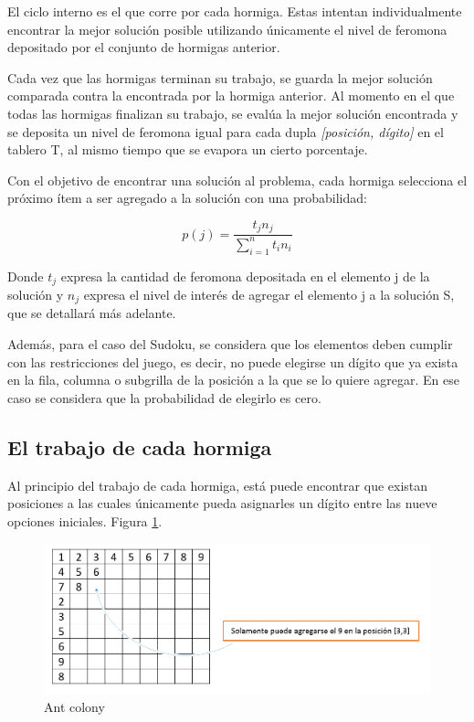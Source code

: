 \documentclass[a4paper,spanish]{article}
\begin{document}
El ciclo interno es el que corre por cada hormiga. Estas intentan individualmente encontrar la
mejor solución posible utilizando únicamente el nivel de feromona depositado por el conjunto
de hormigas anterior. 

Cada vez que las hormigas terminan su trabajo, se guarda la mejor solución comparada contra la
encontrada por la hormiga anterior. Al momento en el que todas las hormigas finalizan su trabajo,
se evalúa la mejor solución encontrada y se deposita un nivel de feromona igual para cada dupla
\emph{[posición, dígito]} en el tablero T, al mismo tiempo que se evapora un cierto porcentaje.

Con el objetivo de encontrar una solución al problema, cada hormiga selecciona el próximo ítem 
a ser agregado a la solución con una probabilidad:

\begin{equation}
	p(j) = \dfrac{t_j n_j}{\sum\limits_{i=1}^n t_i n_i}
\end{equation}

Donde $t_j$ expresa la cantidad de feromona depositada en el elemento j de la solución y $n_j$
expresa el nivel de interés de agregar el elemento j a la solución S, que se detallará más adelante.

Además, para el caso del Sudoku, se considera que los elementos deben cumplir con las restricciones
del juego, es decir, no puede elegirse un dígito que ya exista en la fila, columna o subgrilla de la
posición a la que se lo quiere agregar. En ese caso se considera que la probabilidad de elegirlo es cero.

\clearpage

\subsection{El trabajo de cada hormiga}

Al principio del trabajo de cada hormiga, está puede encontrar que existan posiciones a las cuales
únicamente pueda asignarles un dígito entre las nueve opciones iniciales. Figura \ref{img:soloundigito}.

\begin{figure}[h]
	\centering
	\includegraphics[scale=0.4]{./img/soloundigito.png}
	\caption{Ant colony}
	\label{img:soloundigito}
\end{figure}
\end{document}
